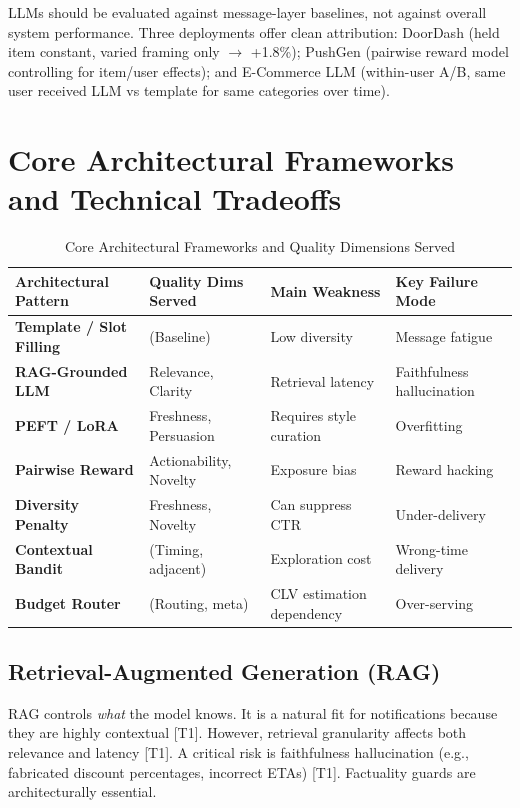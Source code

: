 \documentclass[sigconf]{acmart}
\begin{document}
LLMs should be evaluated against message-layer baselines, not against overall system performance. Three deployments offer clean attribution: DoorDash (held item constant, varied framing only $\rightarrow$ +1.8\%); PushGen (pairwise reward model controlling for item/user effects); and E-Commerce LLM (within-user A/B, same user received LLM vs template for same categories over time).

\section{Core Architectural Frameworks and Technical Tradeoffs}

\begin{table}[t]
\caption{Core Architectural Frameworks and Quality Dimensions Served}
\label{tab:synthesis}
\begin{tabular}{p{3.5cm}p{4.5cm}p{4cm}p{3cm}}
\toprule
\textbf{Architectural Pattern} & \textbf{Quality Dims Served} & \textbf{Main Weakness} & \textbf{Key Failure Mode} \\
\midrule
\textbf{Template / Slot Filling} & (Baseline) & Low diversity & Message fatigue \\
\textbf{RAG-Grounded LLM} & Relevance, Clarity & Retrieval latency & Faithfulness hallucination \\
\textbf{PEFT / LoRA} & Freshness, Persuasion & Requires style curation & Overfitting \\
\textbf{Pairwise Reward} & Actionability, Novelty & Exposure bias & Reward hacking \\
\textbf{Diversity Penalty} & Freshness, Novelty & Can suppress CTR & Under-delivery \\
\textbf{Contextual Bandit} & (Timing, adjacent) & Exploration cost & Wrong-time delivery \\
\textbf{Budget Router} & (Routing, meta) & CLV estimation dependency & Over-serving \\
\bottomrule
\end{tabular}
\end{table}

\subsection{Retrieval-Augmented Generation (RAG)}
RAG controls \textit{what} the model knows. It is a natural fit for notifications because they are highly contextual \cite{lewis2020retrieval} [T1]. However, retrieval granularity affects both relevance and latency \cite{mixofgranularity2025} [T1]. A critical risk is faithfulness hallucination (e.g., fabricated discount percentages, incorrect ETAs) \cite{benchmarking2025} [T1]. Factuality guards are architecturally essential.
\end{document}
